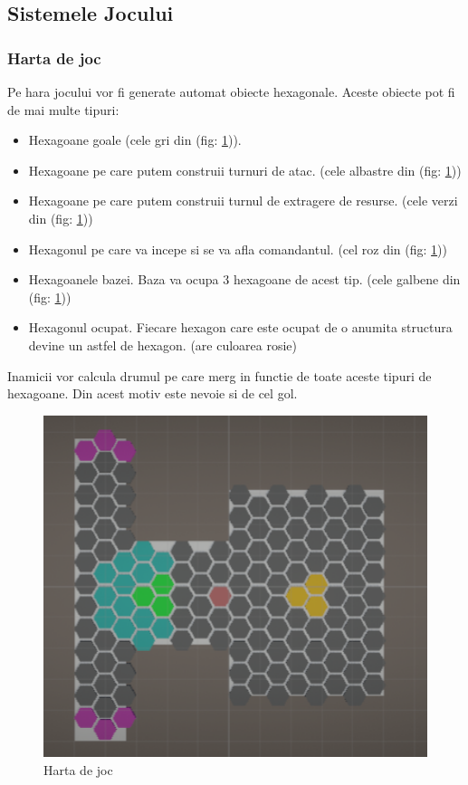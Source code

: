 \documentclass[12pt, a4paper]{article}
\begin{document}
	
	\subsection{Sistemele Jocului}
	
	\subsubsection{Harta de joc}
	
	Pe hara jocului vor fi generate automat obiecte hexagonale. Aceste obiecte pot fi de mai multe tipuri:
	\begin{itemize}
		\item Hexagoane goale (cele gri din (fig: \ref{fig: gridSystem})).
		\item Hexagoane pe care putem construii turnuri de atac. (cele albastre din (fig: \ref{fig: gridSystem}))
		\item Hexagoane pe care putem construii turnul de extragere de resurse. (cele verzi din (fig: \ref{fig: gridSystem}))
		\item Hexagonul pe care va incepe si se va afla comandantul. (cel roz din (fig: \ref{fig: gridSystem}))
		\item Hexagoanele bazei. Baza va ocupa 3 hexagoane de acest tip. (cele galbene din (fig: \ref{fig: gridSystem}))
		\item Hexagonul ocupat. Fiecare hexagon care este ocupat de o anumita structura devine un astfel de hexagon. (are culoarea rosie)
	\end{itemize}

	Inamicii vor calcula drumul pe care merg in functie de toate aceste tipuri de hexagoane. Din acest motiv este nevoie si de cel gol.
	
	\begin{figure}[H]
		\centering
		\includegraphics[width=1\textwidth]{grid.png}
		\caption{Harta de joc}
		\label{fig: gridSystem}
	\end{figure}
\end{document}
